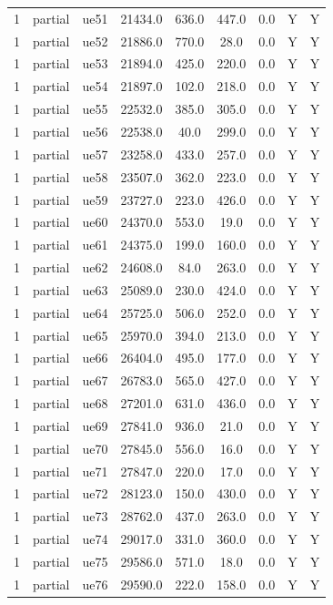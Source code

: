 \begin{table}[ht]
\begin{tabular}{|c|c|c|c|c|c|c|c|c|}
1 & partial & ue51 & 21434.0 & 636.0 & 447.0 & 0.0 & Y & Y \\
1 & partial & ue52 & 21886.0 & 770.0 & 28.0 & 0.0 & Y & Y \\
1 & partial & ue53 & 21894.0 & 425.0 & 220.0 & 0.0 & Y & Y \\
1 & partial & ue54 & 21897.0 & 102.0 & 218.0 & 0.0 & Y & Y \\
1 & partial & ue55 & 22532.0 & 385.0 & 305.0 & 0.0 & Y & Y \\
1 & partial & ue56 & 22538.0 & 40.0 & 299.0 & 0.0 & Y & Y \\
1 & partial & ue57 & 23258.0 & 433.0 & 257.0 & 0.0 & Y & Y \\
1 & partial & ue58 & 23507.0 & 362.0 & 223.0 & 0.0 & Y & Y \\
1 & partial & ue59 & 23727.0 & 223.0 & 426.0 & 0.0 & Y & Y \\
1 & partial & ue60 & 24370.0 & 553.0 & 19.0 & 0.0 & Y & Y \\
1 & partial & ue61 & 24375.0 & 199.0 & 160.0 & 0.0 & Y & Y \\
1 & partial & ue62 & 24608.0 & 84.0 & 263.0 & 0.0 & Y & Y \\
1 & partial & ue63 & 25089.0 & 230.0 & 424.0 & 0.0 & Y & Y \\
1 & partial & ue64 & 25725.0 & 506.0 & 252.0 & 0.0 & Y & Y \\
1 & partial & ue65 & 25970.0 & 394.0 & 213.0 & 0.0 & Y & Y \\
1 & partial & ue66 & 26404.0 & 495.0 & 177.0 & 0.0 & Y & Y \\
1 & partial & ue67 & 26783.0 & 565.0 & 427.0 & 0.0 & Y & Y \\
1 & partial & ue68 & 27201.0 & 631.0 & 436.0 & 0.0 & Y & Y \\
1 & partial & ue69 & 27841.0 & 936.0 & 21.0 & 0.0 & Y & Y \\
1 & partial & ue70 & 27845.0 & 556.0 & 16.0 & 0.0 & Y & Y \\
1 & partial & ue71 & 27847.0 & 220.0 & 17.0 & 0.0 & Y & Y \\
1 & partial & ue72 & 28123.0 & 150.0 & 430.0 & 0.0 & Y & Y \\
1 & partial & ue73 & 28762.0 & 437.0 & 263.0 & 0.0 & Y & Y \\
1 & partial & ue74 & 29017.0 & 331.0 & 360.0 & 0.0 & Y & Y \\
1 & partial & ue75 & 29586.0 & 571.0 & 18.0 & 0.0 & Y & Y \\
1 & partial & ue76 & 29590.0 & 222.0 & 158.0 & 0.0 & Y & Y \\

\end{tabular}
\end{table}
